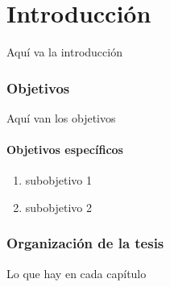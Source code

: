 \chapter*{Introducción}\label{chapter:introduction}

\qquad

Aquí va la introducción




\subsection*{Objetivos}
Aquí van los objetivos

\subsubsection*{Objetivos específicos}

\begin{enumerate}
    \item subobjetivo 1
    \item subobjetivo 2
\end{enumerate}


\subsection*{Organización de la tesis}

Lo que hay en cada capítulo

